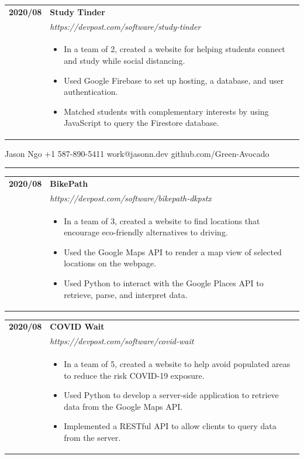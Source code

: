 \documentclass[letterpaper]{article}
\makeatletter
\newcommand{\secondpage}{\pagebreak
                            {\small
                                Jason Ngo
                                \hfill
                                +1 587-890-5411
                                \hfill
                                work@jasonn.dev
                                \hfill
                                github.com/Green-Avocado
                            }
                            \vspace{-4pt}

                            \rule{\textwidth}{0.1pt}

                            \vspace{0.2in}}
\makeatother
\begin{document}
        \begin{tabular}{p{} p{}}
            \textbf{2020/08} & \textbf{Study Tinder} \\
            & \emph{https://devpost.com/software/study-tinder} \\
            & \begin{itemize}
                \item In a team of 2, created a website for helping students connect and study while
                    social distancing.
                \item Used Google Firebase to set up hosting, a database, and user authentication.
                \item Matched students with complementary interests by using JavaScript to query the
                    Firestore database.
            \end{itemize}
        \end{tabular}

    \secondpage

        \begin{tabular}{p{} p{}}
            \textbf{2020/08} & \textbf{BikePath} \\
            & \emph{https://devpost.com/software/bikepath-dkpstx} \\
            & \begin{itemize}
                \item In a team of 3, created a website to find locations that encourage eco-friendly
                    alternatives to driving.
                \item Used the Google Maps API to render a map view of selected locations on the webpage.
                \item Used Python to interact with the Google Places API to retrieve, parse, and
                    interpret data.
            \end{itemize}
        \end{tabular}

        \begin{tabular}{p{} p{}}
            \textbf{2020/08} & \textbf{COVID Wait} \\
            & \emph{https://devpost.com/software/covid-wait} \\
            & \begin{itemize}
                \item In a team of 5, created a website to help avoid populated areas to reduce the risk
                    COVID-19 exposure.
                \item Used Python to develop a server-side application to retrieve data from the Google
                    Maps API.
                \item Implemented a RESTful API to allow clients to query data from the server.
            \end{itemize}
        \end{tabular}
\end{document}
